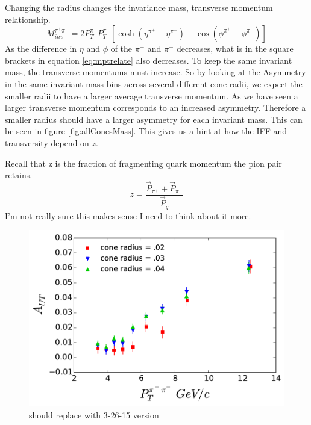 \documentclass[abstract = on,listof=totoc, bibliography=totoc]{scrreprt}
\newcommand{\ptpair}{P_{T}^{\pi^+\pi^-}}
\newcommand{\mpair}{M_{inv}^{\pi^+\pi^-}}
\newcommand{\pip}{\pi^+}
\newcommand{\pim}{\pi^-}
\begin{document}
Changing the radius changes the invariance mass, transverse momentum relationship. 
\begin{equation}
\label{eq:mptrelate}
\mpair = 2P_T^{\pi^+}P_T^{\pi^-}\left[\cosh \left(\eta^{\pi^+}-\eta^{\pi^-}\right) - \cos \left(\phi^{\pi^+}-\phi^{\pi^-}\right)\right]
\end{equation}
%
As the difference in $\eta$ and $\phi$ of the $\pip$ and $\pim$ decreases, what is in the square brackets in equation \ref{eq:mptrelate} also decreases. To keep the same invariant mass, the transverse momentums must increase. So by looking at the Asymmetry in the same invariant mass bins across several different cone radii, we expect the smaller radii to have a larger average transverse momentum. As we have seen a larger transverse momentum corresponds to an increased asymmetry. Therefore a smaller radius should have a larger asymmetry for each invariant mass. This can be seen in figure \ref{fig:allConesMass}. This gives us a hint at how the IFF and transversity depend on $z$. 

Recall that z is the fraction of fragmenting quark momentum the pion pair retains.
\begin{equation}
\label{eq:mptrelate}
z = \frac{\vec{P}_{\pip} + \vec{P}_{\pim}}{\vec{P}_q}
\end{equation}
%
I'm not really sure this makes sense I need to think about it more.

\begin{figure}
\begin{center}
\includegraphics[width = .8\textwidth]{allConeAsymsVs_Pt_8_24_15_HiEta}
\caption[Asymmetry vs $\ptpair$ for different cone radii]{should replace with 3-26-15 version}
\label{fig:allConesPt $\eta > 0$}
\end{center}
\end{figure}
\end{document}
